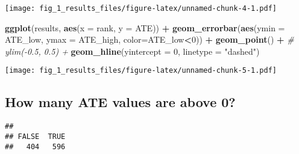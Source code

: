 \documentclass[
]{article}
\newenvironment{Shaded}{\begin{snugshade}}{\end{snugshade}}
\newcommand{\AttributeTok}[1]{\textcolor[rgb]{0.13,0.29,0.53}{#1}}
\newcommand{\CommentTok}[1]{\textcolor[rgb]{0.56,0.35,0.01}{\textit{#1}}}
\newcommand{\DecValTok}[1]{\textcolor[rgb]{0.00,0.00,0.81}{#1}}
\newcommand{\FunctionTok}[1]{\textcolor[rgb]{0.13,0.29,0.53}{\textbf{#1}}}
\newcommand{\NormalTok}[1]{#1}
\newcommand{\SpecialCharTok}[1]{\textcolor[rgb]{0.81,0.36,0.00}{\textbf{#1}}}
\newcommand{\StringTok}[1]{\textcolor[rgb]{0.31,0.60,0.02}{#1}}
\begin{document}
\texttt{[image: fig\_1\_results\_files/figure-latex/unnamed-chunk-4-1.pdf]}

\begin{Shaded}
\begin{Highlighting}[]
\FunctionTok{ggplot}\NormalTok{(results, }\FunctionTok{aes}\NormalTok{(}\AttributeTok{x =}\NormalTok{ rank, }\AttributeTok{y =}\NormalTok{ ATE)) }\SpecialCharTok{+}
  \FunctionTok{geom\_errorbar}\NormalTok{(}\FunctionTok{aes}\NormalTok{(}\AttributeTok{ymin =}\NormalTok{ ATE\_low, }\AttributeTok{ymax =}\NormalTok{ ATE\_high, }\AttributeTok{color=}\NormalTok{ATE\_low}\SpecialCharTok{\textless{}}\DecValTok{0}\NormalTok{)) }\SpecialCharTok{+}
  \FunctionTok{geom\_point}\NormalTok{() }\SpecialCharTok{+} 
  \CommentTok{\# ylim({-}0.5, 0.5) +}
  \FunctionTok{geom\_hline}\NormalTok{(}\AttributeTok{yintercept =} \DecValTok{0}\NormalTok{, }\AttributeTok{linetype =} \StringTok{"dashed"}\NormalTok{)}
\end{Highlighting}
\end{Shaded}

\texttt{[image: fig\_1\_results\_files/figure-latex/unnamed-chunk-5-1.pdf]}

\subsection{How many ATE values are above
0?}\label{how-many-ate-values-are-above-0}

\begin{Shaded}
\end{Shaded}

\begin{verbatim}
## 
## FALSE  TRUE 
##   404   596
\end{verbatim}
\end{document}
